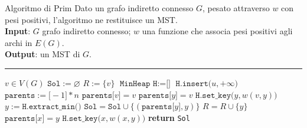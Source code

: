 \documentclass[a4paper, 12pt]{report}
\begin{document}
    \begin{framedalgo}[breakable]{Algoritmo di Prim}
        Dato un grafo indiretto connesso $G$, pesato attraverso $w$ con pesi positivi, l'algoritmo ne restituisce un MST.\\
        \textbf{Input}: $G$ grafo indiretto connesso; $w$ una funzione che associa pesi positivi agli archi in $E(G)$.\\
        \textbf{Output}: un MST di $G$.

        \hrule
        \begin{algorithmic}[1]
                \State $v \in V(G)$
                \State $\texttt{Sol} := \varnothing$
                \State $R := \{v\}$
                \State $\texttt{MinHeap H} := \texttt{[]}$
                    \State $\texttt{H.insert(}u, +\infty\texttt{)}$
                \EndFor
                \State $\texttt{parents} := \texttt{[}-1\texttt{]} * n$
                \State $\texttt{parents[}v\texttt{]} = v$
                    \State $\texttt{parents[}y\texttt{]} = v$
                    \State $\texttt{H.set\_key(}y, w(v, y)\texttt{)}$
                \EndFor
                    \State $y := \texttt{H.extract\_min()}$ 
                        \State $\texttt{Sol} = \texttt{Sol} \cup \{ (\texttt{parents[}y\texttt{]}, y) \}$
                    \State $R = R \cup \{y\}$
                            \State $\texttt{parents[}x\texttt{]} = y$
                            \State $\texttt{H.set\_key(}x, w(x, y)\texttt{)}$
                        \EndIf
                    \EndFor
                \EndWhile
                \State \textbf{return} \texttt{Sol}
            \EndFunction
        \end{algorithmic}
    \end{framedalgo}
\end{document}
